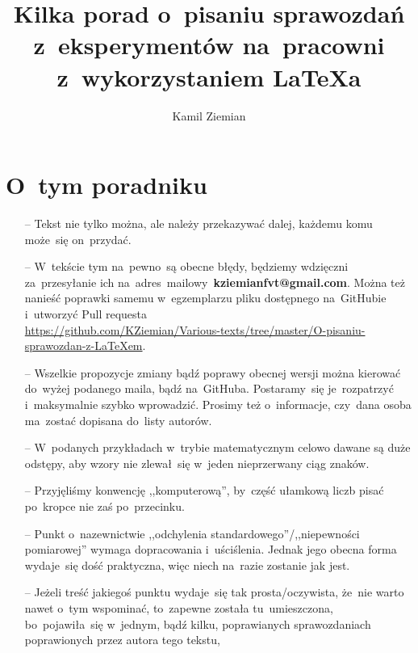 \documentclass[a4paper,11pt]{article}
\title{Kilka porad o~pisaniu sprawozdań z~eksperymentów na~pracowni
  z~wykorzystaniem \LaTeX a}
\author{Kamil Ziemian}
\newcommand{\tb}{\textbf}
\begin{document}


\maketitle



\section*{O~tym poradniku}
\label{sec:otym}


\begin{itemize}
\item[--] Tekst nie tylko można, ale należy przekazywać dalej, każdemu
  komu może~się on~przydać.
\item[--] W~tekście tym na~pewno~są obecne błędy, będziemy wdzięczni
  za~przesyłanie ich na~adres~mailowy~\tb{kziemianfvt@gmail.com}.
  Można też nanieść poprawki samemu w~egzemplarzu pliku dostępnego
  na~GitHubie
  i~utworzyć Pull requesta \\
  \href{https://github.com/KZiemian/Various-texts/tree/master/O-pisaniu-sprawozdan-z-LaTeXem}{https://github.com/KZiemian/Various-texts/tree/master/O-pisaniu-sprawozdan-z-LaTeXem}.
\item[--] Wszelkie propozycje zmiany bądź poprawy obecnej wersji można
  kierować do~wyżej podanego maila, bądź na~GitHuba. Postaramy~się
  je~rozpatrzyć i~maksymalnie szybko wprowadzić. Prosimy też
  o~informacje, czy~dana osoba ma~zostać dopisana do~listy autorów.
\item[--] W~podanych przykładach w~trybie matematycznym celowo dawane
  są duże odstępy, aby wzory nie zlewał~się w~jeden nieprzerwany ciąg
  znaków.
\item[--] Przyjęliśmy konwencję ,,komputerową'', by~część ułamkową
  liczb pisać po~kropce nie zaś po~przecinku.
\item[--] Punkt o~nazewnictwie ,,odchylenia
  standardowego''/,,niepewności pomiarowej'' wymaga dopracowania
  i~uściślenia. Jednak jego obecna forma wydaje~się dość praktyczna,
  więc niech na~razie zostanie jak jest.
\item[--] Jeżeli treść jakiegoś punktu wydaje~się tak
  prosta/oczywista, że~nie warto nawet o~tym wspominać, to~zapewne
  została tu~umieszczona, bo~pojawiła~się w~jednym, bądź kilku,
  poprawianych sprawozdaniach poprawionych przez autora tego tekstu,

\end{itemize}
\end{document}
